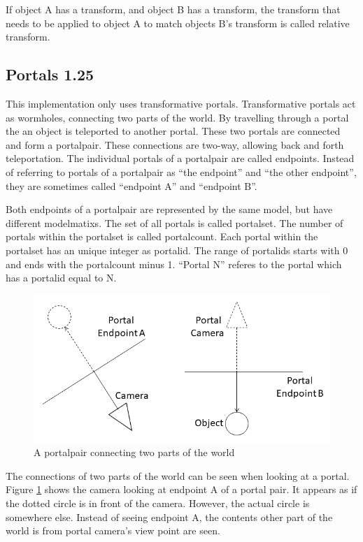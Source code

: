 If object A has a transform, and object B has a transform, the transform that needs to be applied to object A to match objects B's transform is called relative transform.

\subsection{Portals 1.25}
This implementation only uses transformative portals. Transformative portals act as wormholes, connecting two parts of the world. By travelling through a portal the an object is teleported to another portal. These two portals are connected and form a \gls{portalpair}. These connections are two-way, allowing back and forth teleportation. The individual portals of a \gls{portalpair} are called \glspl{endpoint}. Instead of referring to portals of a \gls{portalpair} as \enquote{the \gls{endpoint}} and \enquote{the other \gls{endpoint}}, they are sometimes called \enquote{\gls{endpoint} A} and \enquote{\gls{endpoint} B}.

Both \glspl{endpoint} of a \gls{portalpair} are represented by the same model, but have different \glspl{modelmatix}. The set of all portals is called \gls{portalset}. The number of portals within the \gls{portalset} is called \gls{portalcount}. Each portal within the \gls{portalset} has an unique integer as \gls{portalid}. The range of \glspl{portalid} starts with 0 and ends with the \gls{portalcount} minus 1. \enquote{Portal N} referes to the portal which has a \gls{portalid} equal to N.

\begin{figure}[h]
	\includegraphics[width=\linewidth]{images/portal.png}
	\caption{A \gls{portalpair} connecting two parts of the world}
	\label{fig:portal}
\end{figure}

The connections of two parts of the world can be seen when looking at a portal. Figure \ref{fig:portal} shows the camera looking at endpoint A of a portal pair. It appears as if the dotted circle is in front of the camera. However, the actual circle is somewhere else. Instead of seeing endpoint A, the contents other part of the world is from portal camera's view point are seen.

